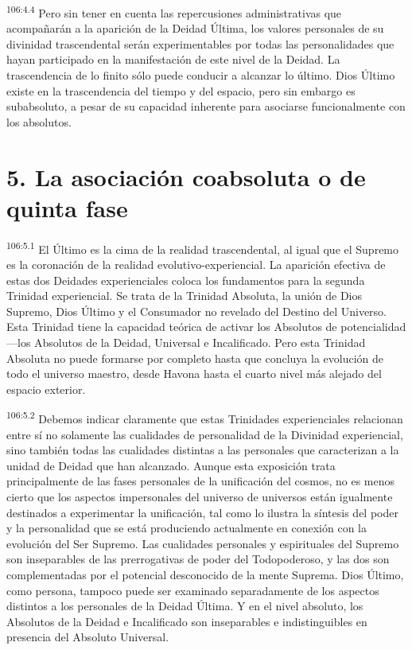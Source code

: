 \par
\textsuperscript{106:4.4} Pero sin tener en cuenta las repercusiones administrativas que acompañarán a la aparición de la Deidad Última, los valores personales de su divinidad trascendental serán experimentables por todas las personalidades que hayan participado en la manifestación de este nivel de la Deidad. La trascendencia de lo finito sólo puede conducir a alcanzar lo último. Dios Último existe en la trascendencia del tiempo y del espacio, pero sin embargo es subabsoluto, a pesar de su capacidad inherente para asociarse funcionalmente con los absolutos.

\section*{5. La asociación coabsoluta o de quinta fase}
\par
\textsuperscript{106:5.1} El Último es la cima de la realidad trascendental, al igual que el Supremo es la coronación de la realidad evolutivo-experiencial. La aparición efectiva de estas dos Deidades experienciales coloca los fundamentos para la segunda Trinidad experiencial. Se trata de la Trinidad Absoluta, la unión de Dios Supremo, Dios Último y el Consumador no revelado del Destino del Universo. Esta Trinidad tiene la capacidad teórica de activar los Absolutos de potencialidad ---los Absolutos de la Deidad, Universal e Incalificado. Pero esta Trinidad Absoluta no puede formarse por completo hasta que concluya la evolución de todo el universo maestro, desde Havona hasta el cuarto nivel más alejado del espacio exterior.

\par
\textsuperscript{106:5.2} Debemos indicar claramente que estas Trinidades experienciales relacionan entre sí no solamente las cualidades de personalidad de la Divinidad experiencial, sino también todas las cualidades distintas a las personales que caracterizan a la unidad de Deidad que han alcanzado. Aunque esta exposición trata principalmente de las fases personales de la unificación del cosmos, no es menos cierto que los aspectos impersonales del universo de universos están igualmente destinados a experimentar la unificación, tal como lo ilustra la síntesis del poder y la personalidad que se está produciendo actualmente en conexión con la evolución del Ser Supremo. Las cualidades personales y espirituales del Supremo son inseparables de las prerrogativas de poder del Todopoderoso, y las dos son complementadas por el potencial desconocido de la mente Suprema. Dios Último, como persona, tampoco puede ser examinado separadamente de los aspectos distintos a los personales de la Deidad Última. Y en el nivel absoluto, los Absolutos de la Deidad e Incalificado son inseparables e indistinguibles en presencia del Absoluto Universal.

